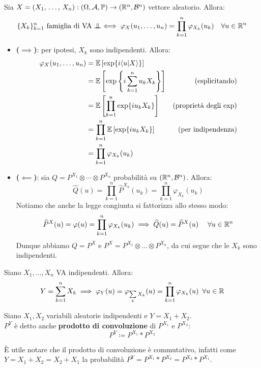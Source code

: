 \begin{teo}
  Sia $X = (X_1, \, \dots, \, X_n):\DoCo[n]$ vettore aleatorio. Allora:
      $$\{X_k\}_{k=1}^{n} \text{ famiglia di VA} \indep \iff \varphi_X(u_1, \dots, u_n) = \prod\limits_{k=1}^{n} \varphi_{X_k} (u_k) \quad \forall u \in \RR^n$$
\end{teo}
\begin{dimo}
  \Fixvmode
  \begin{itemize}
  \item \textbf{($\implies$)}:
    per ipotesi, $X_k$ sono indipendenti. Allora:
    \begin{align*}
      \varphi_X(u_1, \dots, u_n) &= \mathbb E \left[\exp\{i \langle u|X \rangle \} \right]\\
      &= \mathbb E \left[\exp\left\{i\sum\limits_{k=1}^{n} u_k X_k \right\} \right] & (\text{esplicitando})\\
      &= \mathbb E \left[\prod\limits_{k=1}^{n}\exp\{i u_k X_k\} \right] & (\text{proprietà degli exp})\\
      &= \prod\limits_{k=1}^{n}\mathbb E \left[\exp\{i u_k X_k\} \right] & (\text{per indipendenza})\\
      &= \prod\limits_{k=1}^{n}\varphi_{X_k}(u_k)
    \end{align*}

  \item \textbf{($\impliedby$)}:
    sia $Q = P^{X_1} \otimes \cdots \otimes P^{X_n}$ probabilità su $(\mathbb R^n, \mathcal B^n)$. Allora:
    $$\widehat Q(u) = \prod\limits_{k=1}^{n} \widehat P^{X_k}(u_k) = \prod\limits_{k=1}^{n} \varphi_{X_k}(u_k)$$
    Notiamo che anche la legge congiunta si fattorizza allo stesso modo:
    $$\widehat P^X(u) = \varphi(u) = \prod\limits_{k=1}^{n} \varphi_{X_k}(u_k) \implies \widehat{Q}(u) = \widehat{P}^X(u) \; \quad \forall u \in \mathbb R^n$$
    Dunque abbiamo $Q = P^X$ e $P^X = P^{X_1} \otimes \dots \otimes P^{X_n}$, da cui segue che le $X_k$ sono indipendenti. \qedhere
  \end{itemize}
\end{dimo}

\medskip
\begin{corob}[\JPTh{15.2}]
  Siano $X_1, \dots , X_n$ VA indipendenti. Allora:
  $$Y = \sum\limits_{k=1}^{n} X_k \implies \varphi_Y(u) = \varphi_{\sum\limits_{k} X_k} (u) = \prod\limits_{k=1}^{n} \varphi_{X_k}(u) \enspace \forall u \in \mathbb R$$
\end{corob}

\begin{defn}
  Siano $X_1, X_2$ variabili aleatorie indipendenti e $Y=X_1+X_2$. \\
  $P^Y$ è detto anche \textbf{prodotto di convoluzione} di $P^{X_1}$ e $P^{X_2}$:
    $$P^Y \coloneqq P^{X_1} \ast P^{X_2}$$
\end{defn}
È utile notare che il prodotto di convoluzione è commutativo, infatti come $Y = X_1 + X_2 = X_2 + X_1$ la probabilità $P^Y = P^{X_1} \ast P^{X_2} = P^{X_2} \ast P^{X_1}$.

